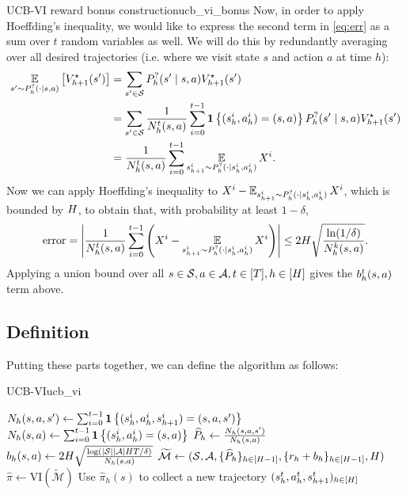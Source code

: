 \documentclass[\main/main]{subfiles}
\begin{document}
\begin{derivation}{UCB-VI reward bonus construction}{ucb_vi_bonus}
    Now, in order to apply Hoeffding's inequality, we would like to express the second term in \eqref{eq:err} as a sum over $t$ random variables as well. We will do this by redundantly averaging over all desired trajectories (i.e. where we visit state $s$ and action $a$ at time $h$):
    \begin{align*}
        \operatorname*{\mathbb{E}}_{s' \sim P^?_h(\cdot \mid s, a)} \left[ V^\star_{h+1}(s') \right]
         & = \sum_{s' \in \mathcal{S}} P^?_h(s' \mid s, a) V^\star_{h+1}(s')                                                                              \\
         & = \sum_{s' \in \mathcal{S}} \frac{1}{N^t_h(s, a)} \sum_{i=0}^{t-1} \mathbf{1}\left\{ (s_h^i, a_h^i) = (s, a) \right\} P^?_h(s' \mid s, a) V^\star_{h+1}(s') \\
         & = \frac{1}{N^t_h(s, a)} \sum_{i=0}^{t-1} \operatorname*{\mathbb{E}}_{s_{h+1}^i \sim P^?_{h}(\cdot \mid s_h^i, a_h^i)} X^i.
    \end{align*}
    Now we can apply Hoeffding's inequality to $X^i - \operatorname*{\mathbb{E}}_{s_{h+1}^i \sim P^?_{h}(\cdot \mid s_h^i, a_h^i)} X^i$, which is bounded by $H$, to obtain that, with probability at least $1-\delta$,
    \[
        \text{error} = \left| \frac{1}{N^t_h(s, a)} \sum_{i=0}^{t-1} \left(X^i - \operatorname*{\mathbb{E}}_{s_{h+1}^i \sim P^?_{h}(\cdot \mid s_h^i, a_h^i)} X^i \right) \right| \le 2 H \sqrt{\frac{\ln(1/\delta)}{N_h^k(s, a)}}.
    \]
    Applying a union bound over all $s \in \mathcal{S}, a \in \mathcal{A}, t \in [T], h \in [H]$ gives the $b_h^t(s, a)$ term above.
\end{derivation}


\subsection{Definition}

Putting these parts together, we can define the algorithm as follows:

\begin{definition}{UCB-VI}{ucb_vi}
    \begin{algorithmic}
        \State
        $N_h(s, a, s') \gets \sum_{i=0}^{t-1} \mathbf{1}\left\{ (s_h^i, a_h^i, s_{h+1}^i) = (s, a, s') \right\}$
        \State $N_h(s, a) \gets \sum_{i=0}^{t-1} \mathbf{1}\left\{ (s_h^i, a_h^i) = (s, a) \right\}$
        \State $\widehat P_h \gets \frac{N_h(s, a, s')}{N_h(s, a)}$
        \State $b_h(s, a) \gets 2 H \sqrt{\frac{\log( |\mathcal{S}||\mathcal{A}|H T/\delta )}{N_h(s, a)}}$
        \State $\widetilde{\mathcal{M}} \gets (\mathcal{S}, \mathcal{A}, \{ \widehat{P}_h \}_{h \in [H-1]}, \{ r_h + b_h \}_{h \in [H-1]}, H)$
        \State $\hat \pi \gets \text{VI}(\tilde{\mathcal{M}})$
        \State Use $\hat \pi_h(s)$ to collect a new trajectory $(s^t_h, a^t_h, s^t_{h+1})_{h \in [H]}$
        \EndFor
    \end{algorithmic}
\end{definition}
\end{document}

